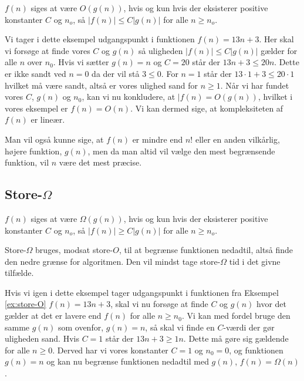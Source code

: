 \begin{defn}
$f(n)$ siges at være $O(g(n))$, hvis og kun hvis der eksisterer positive konstanter $C$ og $n_o$, så $|f(n)| \leq C |g(n)|$ for alle $n \geq n_o$.
\end{defn}


\begin{exmp} \label{ex:store-O}
Vi tager i dette eksempel udgangspunkt i funktionen $f(n)=13n+3$. 
Her skal vi forsøge at finde vores $C$ og $g(n)$ så uligheden $|f(n)| \leq C|g(n)|$ gælder for alle $n$ over $n_0$. Hvis vi sætter $g(n) = n$ og $C=20$ står der $13n+3 \leq 20n$. Dette er ikke sandt ved $n=0$ da der vil stå $3 \leq 0$. For $n=1$ står der $13\cdot 1 + 3 \leq 20 \cdot 1$ hvilket må være sandt, altså er vores ulighed sand for $n \geq 1$.
Når vi har fundet vores $C$, $g(n)$ og $n_0$, kan vi nu konkludere, at $|f(n) = O(g(n))$, hvilket i vores eksempel er $f(n) = O(n)$.
Vi kan dermed sige, at kompleksiteten af $f(n)$ er lineær.
\end{exmp}
Man vil også kunne sige, at $f(n)$ er mindre end $n!$ eller en anden vilkårlig, højere funktion, $g(n)$, men da man altid vil vælge den mest begrænsende funktion, vil $n$ være det mest præcise. 

\subsection{Store-$\Omega$}
\begin{defn}
$f(n)$ siges at være  $\Omega(g(n))$, hvis og kun hvis der eksisterer positive konstanter $C$ og $n_o$, så $|f(n)| \geq C |g(n)|$ for alle $n \geq n_o$.
\end{defn}
Store-$\Omega$ bruges, modsat store-$O$, til at begrænse funktionen nedadtil, altså finde den nedre grænse for algoritmen. Den vil mindst tage store-$\Omega$ tid i det givne tilfælde.
\begin{exmp}
Hvis vi igen i dette eksempel tager udgangspunkt i funktionen fra Eksempel \ref{ex:store-O} $f(n)=13n+3$, skal vi nu forsøge at finde $C$ og $g(n)$ hvor det gælder at det er lavere end $f(n)$ for alle $n \geq n_0$. 
Vi kan med fordel bruge den samme $g(n)$ som ovenfor, $g(n)=n$, så skal vi finde en $C$-værdi der gør uligheden sand. Hvis $C=1$ står der $13n+3 \geq 1n$. Dette må gøre sig gældende for alle $n \geq 0$. Derved har vi vores konstanter $C=1$ og $n_0 = 0$, og funktionen $g(n)=n$ og kan nu begrænse funktionen nedadtil med $g(n)$, $f(n)=\Omega(n)$.
\end{exmp}

